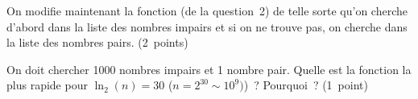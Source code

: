 \begin{xexercice}
\exequest On modifie maintenant la fonction (de la question~2) de telle sorte qu'on cherche d'abord dans la liste des nombres impairs et si on ne trouve pas, on cherche dans la liste des nombres pairs. (2~points)

\exequest On doit chercher 1000 nombres impairs et 1 nombre pair. Quelle est la fonction la plus rapide pour $\ln_2(n)=30$ ($n=2^{30} \sim 10^9)$)~? Pourquoi~? (1~point)








\end{xexercice}



\ifnum{}


